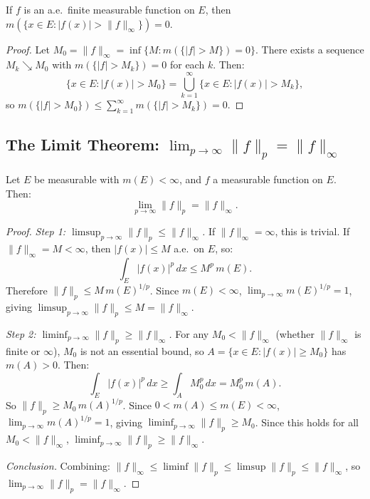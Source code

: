 \documentclass[11pt]{report}
\begin{document}
\begin{propbox}
If $f$ is an a.e.\ finite measurable function on $E$, then $m(\{x \in E : |f(x)| > \|f\|_\infty\}) = 0$.
\end{propbox}

\begin{proof}
Let $M_0 = \|f\|_\infty = \inf\{M : m(\{|f| > M\}) = 0\}$. There exists a sequence $M_k \searrow M_0$ with $m(\{|f| > M_k\}) = 0$ for each $k$. Then:
\[
\{x \in E : |f(x)| > M_0\} = \bigcup_{k=1}^{\infty} \{x \in E : |f(x)| > M_k\},
\]
so $m(\{|f| > M_0\}) \leq \sum_{k=1}^{\infty} m(\{|f| > M_k\}) = 0$.
\end{proof}

\subsection{The Limit Theorem: $\lim_{p \to \infty} \|f\|_p = \|f\|_\infty$}

\begin{thmbox}
Let $E$ be measurable with $m(E) < \infty$, and $f$ a measurable function on $E$. Then:
\[
\lim_{p \to \infty} \|f\|_p = \|f\|_\infty.
\]
\end{thmbox}

\begin{proof}\leavevmode

\textit{Step 1: $\limsup_{p \to \infty} \|f\|_p \leq \|f\|_\infty$.} If $\|f\|_\infty = \infty$, this is trivial. If $\|f\|_\infty = M < \infty$, then $|f(x)| \leq M$ a.e.\ on $E$, so:
\[
\int_E |f(x)|^p\,dx \leq M^p\,m(E).
\]
Therefore $\|f\|_p \leq M\,m(E)^{1/p}$. Since $m(E) < \infty$, $\lim_{p \to \infty} m(E)^{1/p} = 1$, giving $\limsup_{p \to \infty} \|f\|_p \leq M = \|f\|_\infty$.

\textit{Step 2: $\liminf_{p \to \infty} \|f\|_p \geq \|f\|_\infty$.} For any $M_0 < \|f\|_\infty$ (whether $\|f\|_\infty$ is finite or $\infty$), $M_0$ is not an essential bound, so $A = \{x \in E : |f(x)| \geq M_0\}$ has $m(A) > 0$. Then:
\[
\int_E |f(x)|^p\,dx \geq \int_A M_0^p\,dx = M_0^p\,m(A).
\]
So $\|f\|_p \geq M_0\,m(A)^{1/p}$. Since $0 < m(A) \leq m(E) < \infty$, $\lim_{p \to \infty} m(A)^{1/p} = 1$, giving $\liminf_{p \to \infty} \|f\|_p \geq M_0$. Since this holds for all $M_0 < \|f\|_\infty$, $\liminf_{p \to \infty} \|f\|_p \geq \|f\|_\infty$.

\textit{Conclusion.} Combining: $\|f\|_\infty \leq \liminf \|f\|_p \leq \limsup \|f\|_p \leq \|f\|_\infty$, so $\lim_{p \to \infty} \|f\|_p = \|f\|_\infty$.
\end{proof}
\end{document}
